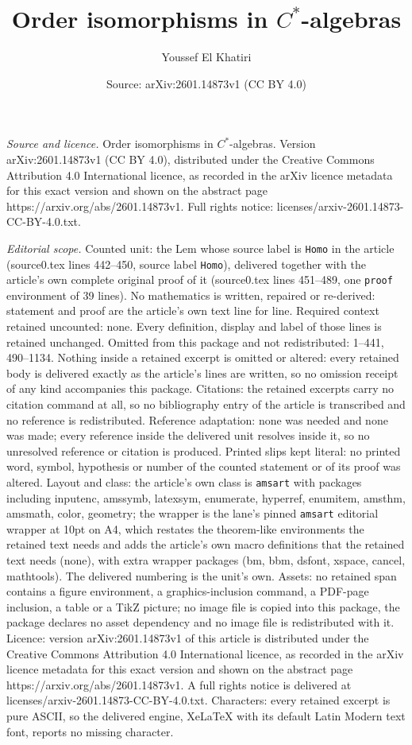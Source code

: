 \documentclass[10pt,a4paper]{amsart}
\title[Order isomorphisms in $C^*$-algebras]{Order isomorphisms in $C^*$-algebras}
\author{Youssef El Khatiri}
\date{Source: arXiv:2601.14873v1 (CC BY 4.0)}
\begin{document}
\maketitle

\noindent\emph{Source and licence.} Order isomorphisms in $C^*$-algebras. Version arXiv:2601.14873v1 (CC BY 4.0), distributed under the Creative Commons Attribution 4.0 International licence, as recorded in the arXiv licence metadata for this exact version and shown on the abstract page https://arxiv.org/abs/2601.14873v1. Full rights notice: licenses/arxiv-2601.14873-CC-BY-4.0.txt.\par\smallskip

\noindent\textit{Editorial scope.} Counted unit: the Lem whose source label is \texttt{Homo} in the article (source0.tex lines 442--450, source label \texttt{Homo}), delivered together with the article's own complete original proof of it (source0.tex lines 451--489, one \texttt{proof} environment of 39 lines). No mathematics is written, repaired or re-derived: statement and proof are the article's own text line for line. Required context retained uncounted: none. Every definition, display and label of those lines is retained unchanged. Omitted from this package and not redistributed: 1--441, 490--1134. Nothing inside a retained excerpt is omitted or altered: every retained body is delivered exactly as the article's lines are written, so no omission receipt of any kind accompanies this package. Citations: the retained excerpts carry no citation command at all, so no bibliography entry of the article is transcribed and no reference is redistributed. Reference adaptation: none was needed and none was made; every reference inside the delivered unit resolves inside it, so no unresolved reference or citation is produced. Printed slips kept literal: no printed word, symbol, hypothesis or number of the counted statement or of its proof was altered. Layout and class: the article's own class is \texttt{amsart} with packages including inputenc, amssymb, latexsym, enumerate, hyperref, enumitem, amsthm, amsmath, color, geometry; the wrapper is the lane's pinned \texttt{amsart} editorial wrapper at 10pt on A4, which restates the theorem-like environments the retained text needs and adds the article's own macro definitions that the retained text needs (none), with extra wrapper packages (bm, bbm, dsfont, xspace, cancel, mathtools). The delivered numbering is the unit's own. Assets: no retained span contains a figure environment, a graphics-inclusion command, a PDF-page inclusion, a table or a TikZ picture; no image file is copied into this package, the package declares no asset dependency and no image file is redistributed with it. Licence: version arXiv:2601.14873v1 of this article is distributed under the Creative Commons Attribution 4.0 International licence, as recorded in the arXiv licence metadata for this exact version and shown on the abstract page https://arxiv.org/abs/2601.14873v1. A full rights notice is delivered at licenses/arxiv-2601.14873-CC-BY-4.0.txt. Characters: every retained excerpt is pure ASCII, so the delivered engine, XeLaTeX with its default Latin Modern text font, reports no missing character.
\end{document}
